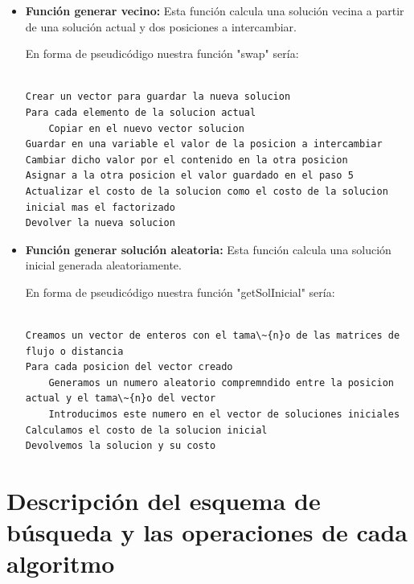 \begin{itemize}
\begin{lstlisting}[language=SH]
    inicializamos una variable suma a 0
    
    desde i=0 hasta N hacer
	    si i no coincide con ninguna de las localizaciones a inercambiar
		    realizar el coste del movimiento de intercambio como la sumatoria de la diferencia de todas las distancias nuevas menos las viejas multiplicadas por el flujo
	
	\end{lstlisting}
	\newpage
	\item \textbf{Función generar vecino:}	
	Esta función calcula una solución vecina a partir de una solución actual y dos posiciones a intercambiar.
	
	En forma de pseudicódigo nuestra función "swap" sería:
	
	\begin{lstlisting}[language=SH]

Crear un vector para guardar la nueva solucion
Para cada elemento de la solucion actual
	Copiar en el nuevo vector solucion
Guardar en una variable el valor de la posicion a intercambiar
Cambiar dicho valor por el contenido en la otra posicion
Asignar a la otra posicion el valor guardado en el paso 5 
Actualizar el costo de la solucion como el costo de la solucion inicial mas el factorizado
Devolver la nueva solucion

	\end{lstlisting}
	
		\item \textbf{Función generar solución aleatoria:}	
		Esta función calcula una solución inicial generada aleatoriamente.
		
		En forma de pseudicódigo nuestra función "getSolInicial" sería:
		
		\begin{lstlisting}[language=SH]
		
Creamos un vector de enteros con el tama\~{n}o de las matrices de flujo o distancia
Para cada posicion del vector creado
	Generamos un numero aleatorio compremndido entre la posicion actual y el tama\~{n}o del vector
	Introducimos este numero en el vector de soluciones iniciales
Calculamos el costo de la solucion inicial
Devolvemos la solucion y su costo
		\end{lstlisting}
\end{itemize} 


\section{Descripción del esquema de búsqueda y las operaciones de cada algoritmo}	
		
